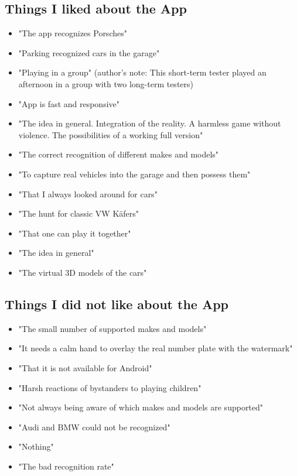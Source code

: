 \clearpage

\subsection{Things I liked about the App}
\begin{itemize}
  \item "The app recognizes Porsches"
  \item "Parking recognized cars in the garage"
  \item "Playing in a group" (author's note: This short-term tester played an afternoon in a group with two long-term testers)
  \item "App is fast and responsive"
  \item "The idea in general. Integration of the reality. A harmless game without violence. The possibilities of a working full version"
  \item "The correct recognition of different makes and models"
  \item "To capture real vehicles into the garage and then possess them"
  \item "That I always looked around for cars"
  \item "The hunt for classic VW K\"afers"
  \item "That one can play it together"
  \item "The idea in general"
  \item "The virtual 3D models of the cars"
\end{itemize}

\subsection{Things I did not like about the App}
\begin{itemize}
  \item "The small number of supported makes and models"
  \item "It needs a calm hand to overlay the real number plate with the watermark"
  \item "That it is not available for Android"
  \item "Harsh reactions of bystanders to playing children"
  \item "Not always being aware of which makes and models are supported"
  \item "Audi and BMW could not be recognized"
  \item "Nothing"
  \item "The bad recognition rate"
\end{itemize}

